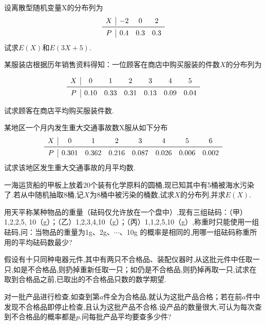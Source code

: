 \begin{xiti}
\item 设离散型随机变量X的分布列为
  \[
    \begin{array}{c|ccc}
      X & {-2} & {0} & {2} \\ \midrule
      P & {0.4} & {0.3} & {0.3} \\
    \end{array}
  \]
试求$ E(X) $和$ E(3X+5) $.

\item 某服装店根据历年销售资料得知：一位顾客在商店中购买服装的件数$ X $的分布列为

  \[
    \begin{array}{c|cccccc}
      X & {0} & {1} & {2} & {3} & {4} & {5} \\ \midrule
      P & {0.10} & {0.33} & {0.31} & {0.13} & {0.09} & {0.04}
    \end{array}
  \]

试求顾客在商店平均购买服装件数.

\item 某地区一个月内发生重大交通事故数X服从如下分布
  \[
    \begin{array}{c|ccccccc}
      X     & 0     & 1     & 2     & 3     & 4     & 5     & 6 \\\midrule
      P     & 0.301 & 0.362 & 0.216 & 0.087 & 0.026 & 0.006 & 0.002 \\
    \end{array}
  \]
试求该地区发生重大交通事故的月平均数.

\item 一海运货船的甲板上放着20个装有化学原料的圆桶,现已知其中有5桶被海水污染了.若从中随机抽取8桶,记$X$为8桶中被污染的桶数,试求$ X $的分布列,并求$ E(X) $.

\item 用天平称某种物品的重量（砝码仅允许放在一个盘中）,现有三组砝码：（甲） 1,2,2,5,
10（g）；（乙）1,2,3,4,10（g）；（丙）1,1,2,5,10（g）,称重时只能使用一组砝码,问：当物品的重量为1g、2g、$\cdots$、10g 的概率是相同的,用哪一组砝码称重所用的平均砝码数最少?

\item 假设有十只同种电器元件,其中有两只不合格品、装配仪器时,从这批元件中任取一只,如是不合格品,则扔掉重新任取一只；如仍是不合格品,则扔掉再取一只,试求在取到合格品之前,已取出的不合格品只数的数学期望.

\item 对一批产品进行检查,如查到第$ a $件全为合格品,就认为这批产品合格；若在前$ a $件中发现不合格品即停止检查,且认为这批产品不合格.设产品的数量很大,可认为每次查到不合格品的概率都是$ p $.问每批产品平均要查多少件?


\end{xiti}
